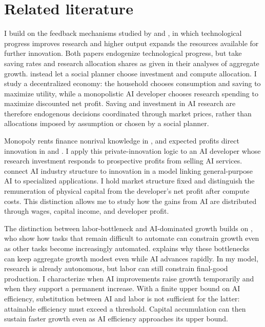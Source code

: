 \section{Related literature}
\label{sec:rewrite-literature}

I build on the feedback mechanisms studied by \citet{davidsonetal2026} and \citet{jonestonetti2026}, in which technological progress improves research and higher output expands the resources available for further innovation. Both papers endogenize technological progress, but take saving rates and research allocation shares as given in their analyses of aggregate growth. \citet{erdiletal2025gate} instead let a social planner choose investment and compute allocation. I study a decentralized economy: the household chooses consumption and saving to maximize utility, while a monopolistic AI developer chooses research spending to maximize discounted net profit. Saving and investment in AI research are therefore endogenous decisions coordinated through market prices, rather than allocations imposed by assumption or chosen by a social planner.

Monopoly rents finance nonrival knowledge in \citet{romer1990}, and
expected profits direct innovation in \citet{acemoglurestrepo2018} and
\citet{hemousolsen2022}. I apply this private-innovation logic to an AI
developer whose research investment responds to prospective profits from selling
AI services. \citet{liuwan2026} connect AI industry structure to innovation
in a model linking general-purpose AI to specialized applications.
I hold market structure fixed and distinguish the remuneration of physical
capital from the developer's net profit after compute costs. This
distinction allows me to study how the gains from AI are distributed
through wages, capital income, and developer profit.

The distinction between labor-bottleneck and AI-dominated growth builds on
\citet{aghionjonesjones2019}, who show how tasks that remain difficult to
automate can constrain growth even as other tasks become increasingly
automated. \citet{jones2026future} explains why these bottlenecks can keep
aggregate growth modest even while AI advances rapidly.
In my model, research is already autonomous, but labor can still
constrain final-good production. I characterize when AI improvements raise
growth temporarily and when they support a permanent increase. With a finite
upper bound on AI efficiency, substitution between AI and labor is not
sufficient for the latter: attainable efficiency must exceed a threshold.
Capital accumulation can then sustain faster growth even as AI efficiency
approaches its upper bound.

